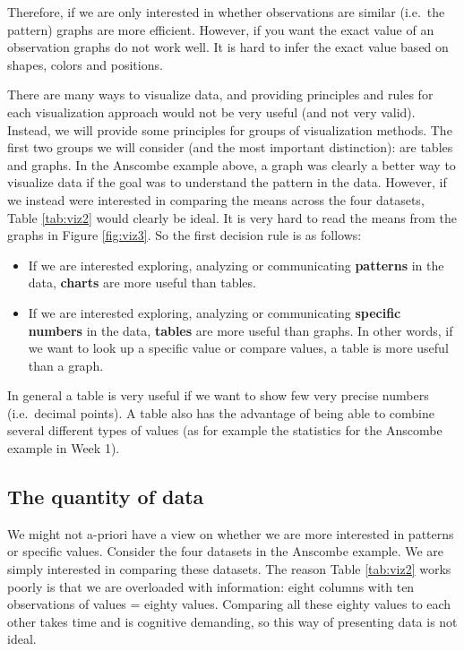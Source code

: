 \documentclass[]{book}
\providecommand{\tightlist}{%
  \setlength{\itemsep}{0pt}\setlength{\parskip}{0pt}}
\begin{document}
Therefore, if we are only interested in whether observations are similar (i.e.~the pattern) graphs are more efficient. However, if you want the exact value of an observation graphs do not work well. It is hard to infer the exact value based on shapes, colors and positions.

There are many ways to visualize data, and providing principles and rules for each visualization approach would not be very useful (and not very valid). Instead, we will provide some principles for groups of visualization methods. The first two groups we will consider (and the most important distinction): are tables and graphs. In the Anscombe example above, a graph was clearly a better way to visualize data if the goal was to understand the pattern in the data. However, if we instead were interested in comparing the means across the four datasets, Table \ref{tab:viz2} would clearly be ideal. It is very hard to read the means from the graphs in Figure \ref{fig:viz3}. So the first decision rule is as follows:

\begin{itemize}
\tightlist
\item
  If we are interested exploring, analyzing or communicating \textbf{patterns} in the data, \textbf{charts} are more useful than tables.
\item
  If we are interested exploring, analyzing or communicating \textbf{specific numbers} in the data, \textbf{tables} are more useful than graphs. In other words, if we want to look up a specific value or compare values, a table is more useful than a graph.
\end{itemize}

In general a table is very useful if we want to show few very precise numbers (i.e.~decimal points). A table also has the advantage of being able to combine several different types of values (as for example the statistics for the Anscombe example in Week 1).

\hypertarget{the-quantity-of-data}{%
\subsection{The quantity of data}\label{the-quantity-of-data}}

We might not a-priori have a view on whether we are more interested in patterns or specific values. Consider the four datasets in the Anscombe example. We are simply interested in comparing these datasets. The reason Table \ref{tab:viz2} works poorly is that we are overloaded with information: eight columns with ten observations of values = eighty values. Comparing all these eighty values to each other takes time and is cognitive demanding, so this way of presenting data is not ideal.
\end{document}
